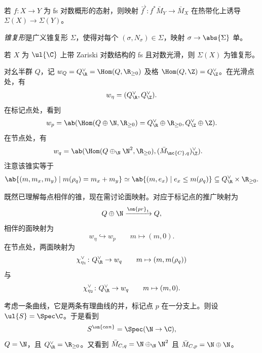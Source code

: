 \begin{exm}
    若 \(f \colon X \to Y\) 为 fs 对数概形的态射，则映射 \(\bar{f}^{\flat} \colon f^* \bar{M}_Y \to \bar{M}_X\) 在热带化上诱导 \(\Sigma(X) \to \Sigma(Y)\)。
\end{exm}

\begin{defn}
    \textit{锥复形}是广义锥复形 \(\Sigma\)，使得对每个 \((\sigma, N_{\sigma}) \in \Sigma\)，映射 \(\sigma \to \abs{\Sigma}\) 单。
\end{defn}

\begin{thm}
    若 \(X\) 为 \(\ul{\C}\) 上带 Zariski 对数结构的 fs 且对数光滑，则 \(\Sigma(X)\) 为锥复形。
\end{thm}

对幺半群 \(Q\)，记 \(w_Q = Q_{\R}^{\vee} = \Hom(Q, \R_{\geq 0})\) 及格 \(\Hom(Q, \Z) = Q_{\Z}^{\vee}\)。在光滑点处，有
\[ w_{\eta} = (Q_{\R}^{\vee}, Q_{\Z}^{\vee}). \]
在标记点处，看到
\[ w_p = \ab(\Hom (Q \oplus \N, \R_{\geq 0}) = Q_{\R}^{\vee} \oplus \R_{\geq 0}, Q_{\Z}^{\vee}\oplus \Z). \]
在节点处，有
\begin{align*}
    w_q &= \ab(\Hom(Q \oplus_{\N} \N^2, \R_{\geq 0}), ( \bar{M}_{\mc{C}, q} )_{\Z}^{\vee}).
\end{align*}
注意该锥实等于
\[ \ab\{(m, m_x, m_y) \mid m(\rho_q) = m_x + m_y \} \simeq \ab\{(m, e_x) \mid e_x \leq m(\rho_q) \} \subseteq Q_{\R}^{\vee} \times \R_{\geq 0}. \]

既然已理解每点相伴的锥，现在需讨论面映射。对应于标记点的推广映射为
\[ Q \oplus \N \xrightarrow{\on{pr}_1} Q, \]
相伴的面映射为
\[ w_{\eta} \hookrightarrow w_p \qquad m \mapsto (m,0). \]
在节点处，两面映射为
\[ \chi_{\eta_1}^{\vee} \colon Q_{\R}^{\vee} \to w_q \qquad m \mapsto (m, m(\rho_q)) \]
与
\[ \chi_{\eta_2}^{\vee} \colon Q_{\R}^{\vee} \to w_q \qquad m \mapsto (m, 0). \]

\begin{exm}
    考虑一条曲线，它是两条有理曲线的并，标记点 \(p\) 在一分支上。则设 \(\ul{S} = \Spec \C\)。于是看到
    \[ S^{\on{can}} = \Spec(\N \to \C), \]
    \(Q = \N\)，且 \(Q_{\R}^{\vee} = \R_{\geq 0}\)。又看到 \(\bar{M}_{C, q} = \N \oplus_{\N} \N^2\) 且 \(\bar{M}_{C, p} = \N \oplus \N\)。
\end{exm}

